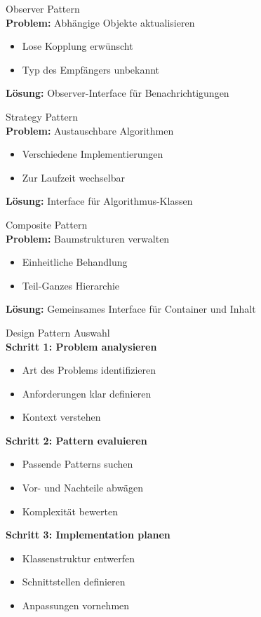 \begin{definition}{Observer Pattern}\\
\textbf{Problem:} Abhängige Objekte aktualisieren
\begin{itemize}
    \item Lose Kopplung erwünscht
    \item Typ des Empfängers unbekannt
\end{itemize}
\textbf{Lösung:} Observer-Interface für Benachrichtigungen
\end{definition}

\begin{definition}{Strategy Pattern}\\
\textbf{Problem:} Austauschbare Algorithmen
\begin{itemize}
    \item Verschiedene Implementierungen
    \item Zur Laufzeit wechselbar
\end{itemize}
\textbf{Lösung:} Interface für Algorithmus-Klassen
\end{definition}

\begin{definition}{Composite Pattern}\\
\textbf{Problem:} Baumstrukturen verwalten
\begin{itemize}
    \item Einheitliche Behandlung
    \item Teil-Ganzes Hierarchie
\end{itemize}
\textbf{Lösung:} Gemeinsames Interface für Container und Inhalt
\end{definition}

\begin{KR}{Design Pattern Auswahl}\\
\textbf{Schritt 1: Problem analysieren}
\begin{itemize}
    \item Art des Problems identifizieren
    \item Anforderungen klar definieren
    \item Kontext verstehen
\end{itemize}

\textbf{Schritt 2: Pattern evaluieren}
\begin{itemize}
    \item Passende Patterns suchen
    \item Vor- und Nachteile abwägen
    \item Komplexität bewerten
\end{itemize}

\textbf{Schritt 3: Implementation planen}
\begin{itemize}
    \item Klassenstruktur entwerfen
    \item Schnittstellen definieren
    \item Anpassungen vornehmen
\end{itemize}
\end{KR}


